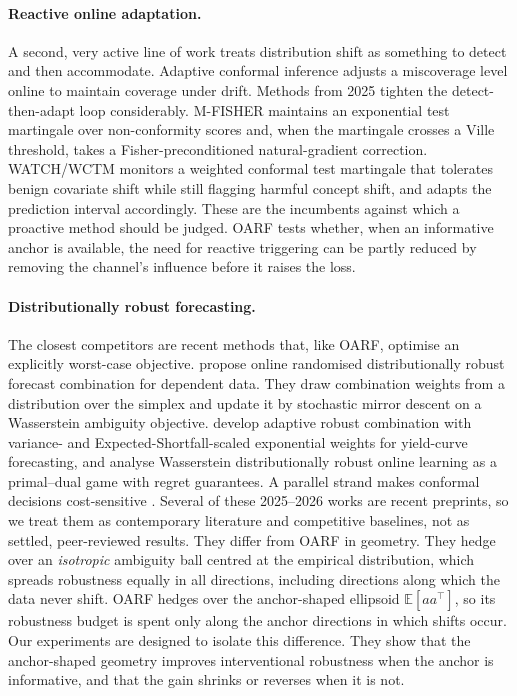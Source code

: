 \documentclass[12pt]{article}
\theoremstyle{plain}
\theoremstyle{remark}
\newcommand{\E}{\mathbb{E}}
\newcommand{\OARF}{\textsc{OARF}}
\begin{document}
\paragraph{Reactive online adaptation.} A second, very active line of work treats
distribution shift as something to detect and then accommodate. Adaptive conformal
inference \citep{gibbs2021aci} adjusts a miscoverage level online to maintain
coverage under drift. Methods from 2025 tighten the detect-then-adapt loop
considerably. M-FISHER \citep{mfisher2025} maintains an exponential test martingale
over non-conformity scores and, when the martingale crosses a Ville threshold,
takes a Fisher-preconditioned natural-gradient correction. WATCH/WCTM
\citep{watch2025} monitors a weighted conformal test martingale that tolerates
benign covariate shift while still flagging harmful concept shift, and adapts the
prediction interval accordingly. These are the incumbents against which a proactive
method should be judged. \OARF{} tests whether, when an informative anchor is
available, the need for reactive triggering can be partly reduced by removing the
channel's influence before it raises the loss.

\paragraph{Distributionally robust forecasting.} The closest competitors are
recent methods that, like \OARF{}, optimise an explicitly worst-case objective.
\citet{wang2026online} propose online randomised distributionally robust forecast
combination for dependent data. They draw combination weights from a distribution
over the simplex and update it by stochastic mirror descent on a Wasserstein
ambiguity objective. \citet{liu2026fcdro} develop adaptive robust combination with
variance- and Expected-Shortfall-scaled exponential weights for yield-curve
forecasting, and \citet{chen2026wdro} analyse Wasserstein distributionally robust
online learning as a primal--dual game with regret guarantees. A parallel strand
makes conformal decisions cost-sensitive \citep{costaci2026}. Several of these
2025--2026 works are recent preprints, so we treat them as contemporary literature
and competitive baselines, not as settled, peer-reviewed results. They differ from
\OARF{} in geometry. They hedge over an \emph{isotropic} ambiguity ball centred at
the empirical distribution, which spreads robustness equally in all directions,
including directions along which the data never shift. \OARF{} hedges over the
anchor-shaped ellipsoid $\E[aa^\top]$, so its robustness budget is spent only
along the anchor directions in which shifts occur. Our experiments are designed to
isolate this difference. They show that the anchor-shaped geometry improves
interventional robustness when the anchor is informative, and that the gain shrinks
or reverses when it is not.
\end{document}
